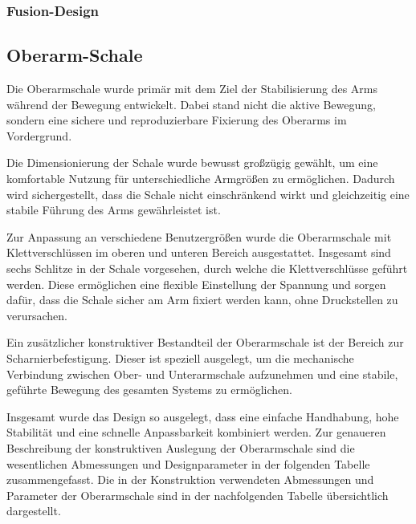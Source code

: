 \documentclass{article}
\begin{document}
\subsubsection{Fusion-Design}

\newpage
\subsection{Oberarm-Schale}

Die Oberarmschale wurde primär mit dem Ziel der Stabilisierung des Arms während der Bewegung entwickelt. Dabei stand nicht die aktive Bewegung, sondern eine sichere und reproduzierbare Fixierung des Oberarms im Vordergrund.

Die Dimensionierung der Schale wurde bewusst großzügig gewählt, um eine komfortable Nutzung für unterschiedliche Armgrößen zu ermöglichen. Dadurch wird sichergestellt, dass die Schale nicht einschränkend wirkt und gleichzeitig eine stabile Führung des Arms gewährleistet ist.

Zur Anpassung an verschiedene Benutzergrößen wurde die Oberarmschale mit Klettverschlüssen im oberen und unteren Bereich ausgestattet. Insgesamt sind sechs Schlitze in der Schale vorgesehen, durch welche die Klettverschlüsse geführt werden. Diese ermöglichen eine flexible Einstellung der Spannung und sorgen dafür, dass die Schale sicher am Arm fixiert werden kann, ohne Druckstellen zu verursachen.

Ein zusätzlicher konstruktiver Bestandteil der Oberarmschale ist der Bereich zur Scharnierbefestigung. Dieser ist speziell ausgelegt, um die mechanische Verbindung zwischen Ober- und Unterarmschale aufzunehmen und eine stabile, geführte Bewegung des gesamten Systems zu ermöglichen.

Insgesamt wurde das Design so ausgelegt, dass eine einfache Handhabung, hohe Stabilität und eine schnelle Anpassbarkeit kombiniert werden. Zur genaueren Beschreibung der konstruktiven Auslegung der Oberarmschale sind die wesentlichen Abmessungen und Designparameter in der folgenden Tabelle zusammengefasst. Die in der Konstruktion verwendeten Abmessungen und Parameter der Oberarmschale sind in der nachfolgenden Tabelle übersichtlich dargestellt.\newpage
\end{document}
